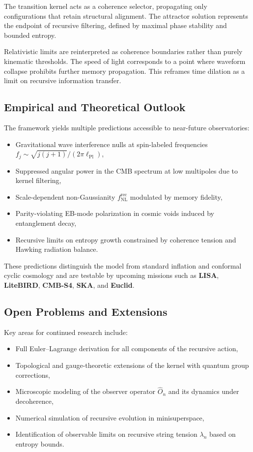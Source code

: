 The transition kernel acts as a coherence selector, propagating only configurations that retain structural alignment. The attractor solution represents the endpoint of recursive filtering, defined by maximal phase stability and bounded entropy.

Relativistic limits are reinterpreted as coherence boundaries rather than purely kinematic thresholds. The speed of light corresponds to a point where waveform collapse prohibits further memory propagation. This reframes time dilation as a limit on recursive information transfer.

\subsection{Empirical and Theoretical Outlook}

The framework yields multiple predictions accessible to near-future observatories:
\begin{itemize}
    \item Gravitational wave interference nulls at spin-labeled frequencies \( f_j \sim \sqrt{j(j+1)} / (2\pi \ell_{\text{Pl}}) \),
    \item Suppressed angular power in the CMB spectrum at low multipoles due to kernel filtering,
    \item Scale-dependent non-Gaussianity \( f_{\text{NL}}^{\text{rec}} \) modulated by memory fidelity,
    \item Parity-violating EB-mode polarization in cosmic voids induced by entanglement decay,
    \item Recursive limits on entropy growth constrained by coherence tension and Hawking radiation balance.
\end{itemize}

These predictions distinguish the model from standard inflation and conformal cyclic cosmology and are testable by upcoming missions such as \textbf{LISA}, \textbf{LiteBIRD}, \textbf{CMB-S4}, \textbf{SKA}, and \textbf{Euclid}.

\subsection{Open Problems and Extensions}

Key areas for continued research include:
\begin{itemize}
    \item Full Euler–Lagrange derivation for all components of the recursive action,
    \item Topological and gauge-theoretic extensions of the kernel with quantum group corrections,
    \item Microscopic modeling of the observer operator \( \hat{O}_n \) and its dynamics under decoherence,
    \item Numerical simulation of recursive evolution in minisuperspace,
    \item Identification of observable limits on recursive string tension \( \lambda_n \) based on entropy bounds.
\end{itemize}

